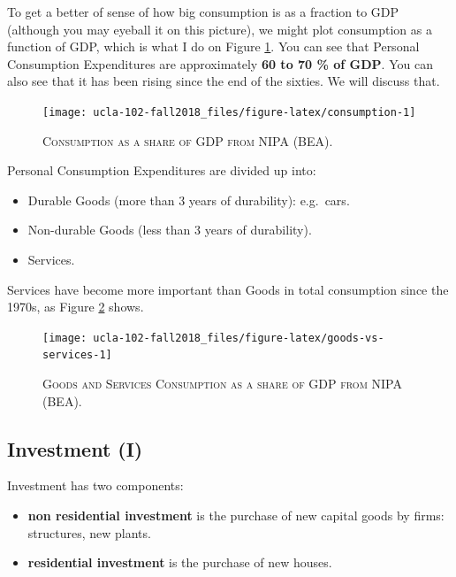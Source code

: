 \documentclass[]{book}
\providecommand{\tightlist}{%
  \setlength{\itemsep}{0pt}\setlength{\parskip}{0pt}}
\theoremstyle{definition}
\theoremstyle{definition}
\theoremstyle{definition}
\theoremstyle{remark}
\begin{document}
To get a better of sense of how big consumption is as a fraction to GDP
(although you may eyeball it on this picture), we might plot consumption
as a function of GDP, which is what I do on Figure
\ref{fig:consumption}. You can see that Personal Consumption
Expenditures are approximately \textbf{60 to 70 \% of GDP}. You can also
see that it has been rising since the end of the sixties. We will
discuss that.




\begin{figure}

{\centering \texttt{[image: ucla-102-fall2018\_files/figure-latex/consumption-1]} 

}

\caption{\textsc{Consumption as a share of GDP from NIPA
(BEA)}.}\label{fig:consumption}
\end{figure}

Personal Consumption Expenditures are divided up into:

\begin{itemize}
\tightlist
\item
  Durable Goods (more than 3 years of durability): e.g.~cars.
\item
  Non-durable Goods (less than 3 years of durability).
\item
  Services.
\end{itemize}

Services have become more important than Goods in total consumption
since the 1970s, as Figure \ref{fig:goods-vs-services} shows.




\begin{figure}

{\centering \texttt{[image: ucla-102-fall2018\_files/figure-latex/goods-vs-services-1]} 

}

\caption{\textsc{Goods and Services Consumption as
a share of GDP from NIPA (BEA)}.}\label{fig:goods-vs-services}
\end{figure}

\hypertarget{inv}{\subsection{Investment (I)}\label{inv}}

Investment has two components:

\begin{itemize}
\tightlist
\item
  \textbf{non residential investment} is the purchase of new capital
  goods by firms: structures, new plants.
\item
  \textbf{residential investment} is the purchase of new houses.
\end{itemize}
\end{document}
